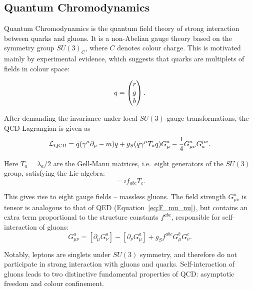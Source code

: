 \newpage
\subsection{Quantum Chromodynamics}
\label{ss:QCD_theory}
Quantum Chromodynamics is the quantum field theory of strong interaction between quarks and gluons. It is a non-Abelian
gauge theory based on the symmetry group $SU(3)_C$, where $C$ denotes colour charge. This is motivated mainly by
experimental evidence, which suggests that quarks are multiplets of fields in colour space:

\begin{equation}
q = \begin{pmatrix} r \\ g \\ b \end{pmatrix}.
\end{equation} 

After demanding the invariance
under local $SU(3)$ gauge transformations, the QCD Lagrangian is given as
\begin{equation}
\label{eq:QCD_L}
\mathcal{L}_\textrm{QCD} = \bar{q} (\gamma^\mu \partial_\mu -m)q + g_S (\bar{q} \gamma^\mu T_a q) G^a_\mu -  \frac{1}{4} G^a_{\mu\nu}
G_a^{\mu\nu}.
\end{equation}

Here $T_a = \lambda_a / 2$ are the Gell-Mann matrices, i.e.\ eight generators of the $SU(3)$ group, satisfying the Lie
algebra:
\begin{equation}
[T_a,T_b] = i f_{abc} T_c.
\end{equation}

This gives rise to eight gauge fields -- massless gluons. The field strength $G^a_{\mu\nu}$ is tensor is analogous to
that of QED (Equation~\ref{eq:F_mu_nu}), but contains an extra term proportional to the structure constants $f^{abc}$,
responsible for self-interaction of gluons:
\begin{equation}
\label{eq:G_mu_nu}
G^a_{\mu\nu} = [\partial_\mu G^a_\nu] - [\partial_\nu G^a_\mu] + g_S f^{abc} G^b_\mu G^c_\nu.
\end{equation}

Notably, leptons are singlets under $SU(3)$ symmetry, and therefore do not participate in strong interaction with gluons
and quarks. Self-interaction of gluons leads to two distinctive fundamental properties of QCD: asymptotic freedom and
colour confinement.


